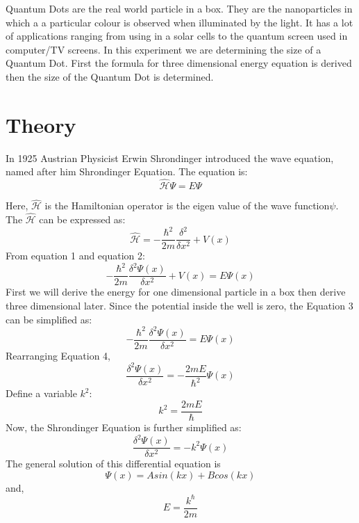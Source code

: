 \documentclass[12pt]{report}
\newcommand*{\hatH}{\hat{\mathcal{H}}}
\begin{document}
Quantum Dots are the real world particle in a box. They are the nanoparticles in which a a particular colour is observed when illuminated by the light. It has a lot of applications ranging from using in a solar cells to the quantum screen used in computer/TV screens.
\newline In this experiment we are determining the size of a Quantum Dot. First the formula for three dimensional energy equation is derived then the size of the Quantum Dot is determined.


\section{Theory}
In 1925 Austrian Physicist Erwin Shrondinger introduced the wave equation, named after him Shrondinger Equation. The equation is:
\begin{equation}
    \hatH \Psi = E \Psi          
\end{equation}

Here, $\hatH$ is the Hamiltonian operator is the eigen value of the wave function$\psi$. The $\hatH$ can be expressed as:
\begin{equation}
    \hatH = - \frac{\hbar^2}{2m} \frac{\delta^2}{\delta x^2} + V(x)
\end{equation}
 From equation 1 and equation 2:
 \begin{equation}
    - \frac{\hbar^2}{2m} \frac{\delta^2 \Psi(x)}{\delta x^2} + V(x) = E \Psi(x)
 \end{equation}
First we will derive the energy for one dimensional particle in a box then derive three dimensional later. Since the potential inside the well is zero, the Equation 3 can be simplified as:
\begin{equation}
     - \frac{\hbar^2}{2m} \frac{\delta^2 \Psi(x)}{\delta x^2} = E \Psi(x)
\end{equation}
Rearranging Equation 4,
\begin{equation}
    \frac{\delta^2 \Psi(x)}{\delta x^2} =  - \frac{2mE}{\hbar^2} \Psi(x)
\end{equation}
Define a variable $k^2$:
\begin{equation}
    k^2 = \frac{2mE}{\hbar}
\end{equation}
Now, the Shrondinger Equation is further simplified as:
\begin{equation}
    \frac{\delta^2 \Psi(x)}{\delta x^2} =  -k^2 \Psi(x)
\end{equation}
The general solution of this differential equation is
\begin{equation}
    \Psi(x) = Asin(kx) + Bcos(kx)
\end{equation}
and,
\begin{equation}
      E = \frac{k^\hbar}{2m}
\end{equation}
\end{document}

